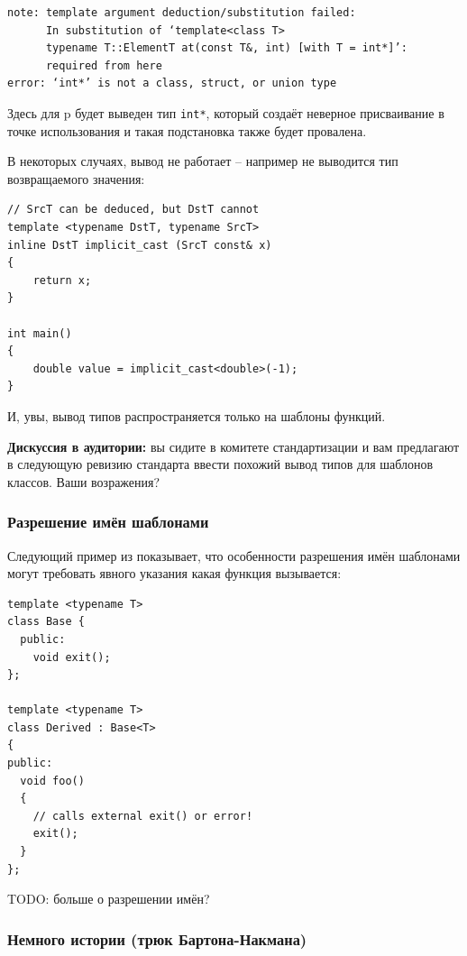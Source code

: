 \documentclass[a4paper,12pt,oneside]{article}
\begin{document}
\begin{verbatim}
note: template argument deduction/substitution failed:
      In substitution of ‘template<class T> 
      typename T::ElementT at(const T&, int) [with T = int*]’:
      required from here
error: ‘int*’ is not a class, struct, or union type
\end{verbatim}

Здесь для p будет выведен тип \lstinline!int*!, который создаёт неверное присваивание в точке использования и такая подстановка также будет провалена.

В некоторых случаях, вывод не работает -- например не выводится тип возвращаемого значения:

\begin{lstlisting}
// SrcT can be deduced, but DstT cannot 
template <typename DstT, typename SrcT> 
inline DstT implicit_cast (SrcT const& x)  
{ 
    return x; 
} 

int main() 
{ 
    double value = implicit_cast<double>(-1); 
} 
\end{lstlisting}

И, увы, вывод типов распространяется только на шаблоны функций.

\textbf{Дискуссия в аудитории:} вы сидите в комитете стандартизации и вам предлагают в следующую ревизию стандарта ввести похожий вывод типов для шаблонов классов. Ваши возражения?

\subsubsection{Разрешение имён шаблонами}\label{TemplateNameResolution}

Следующий пример из \cite{vandervoord} показывает, что особенности разрешения имён шаблонами могут требовать явного указания какая функция вызывается:

\begin{lstlisting}
template <typename T> 
class Base { 
  public: 
    void exit(); 
};

template <typename T> 
class Derived : Base<T> 
{ 
public: 
  void foo() 
  { 
    // calls external exit() or error! 
    exit();   
  } 
}; 
\end{lstlisting}

TODO: больше о разрешении имён?

\subsubsection{Немного истории (трюк Бартона-Накмана)}\label{BartonNackman}
\end{document}
